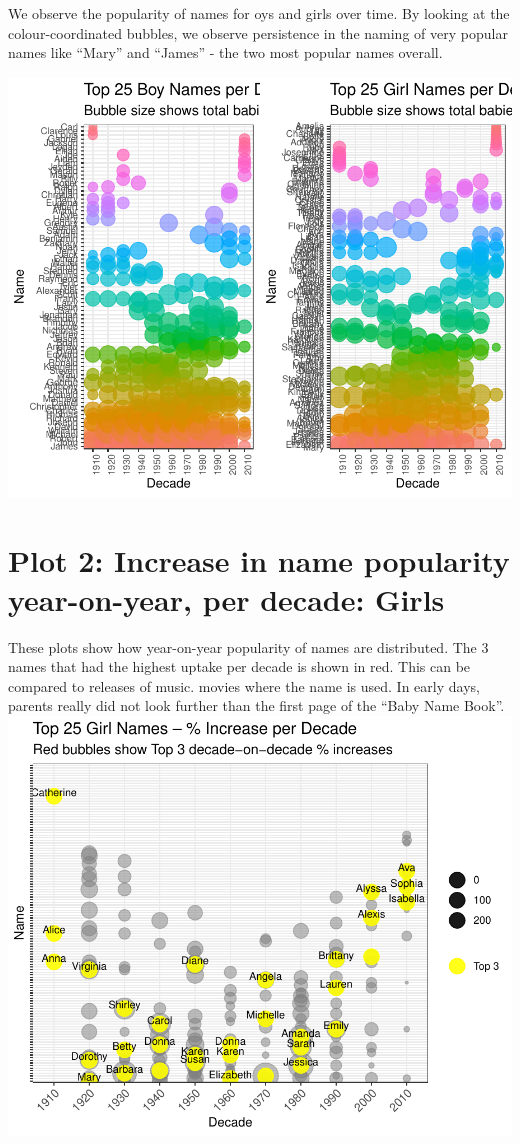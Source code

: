 \documentclass[11pt,preprint]{elsarticle}
\numberwithin{equation}{section}
\numberwithin{figure}{section}
\numberwithin{table}{section}
\begin{document}
We observe the popularity of names for oys and girls over time. By
looking at the colour-coordinated bubbles, we observe persistence in the
naming of very popular names like ``Mary'' and ``James'' - the two most
popular names overall.

\begin{center}\includegraphics{Question1_files/figure-latex/unnamed-chunk-1-1} \end{center}

\section{Plot 2: Increase in name popularity year-on-year, per decade:
Girls}\label{plot-2-increase-in-name-popularity-year-on-year-per-decade-girls}

These plots show how year-on-year popularity of names are distributed.
The 3 names that had the highest uptake per decade is shown in red. This
can be compared to releases of music. movies where the name is used. In
early days, parents really did not look further than the first page of
the ``Baby Name Book''.
\includegraphics{Question1_files/figure-latex/unnamed-chunk-2-1.pdf}
\end{document}

